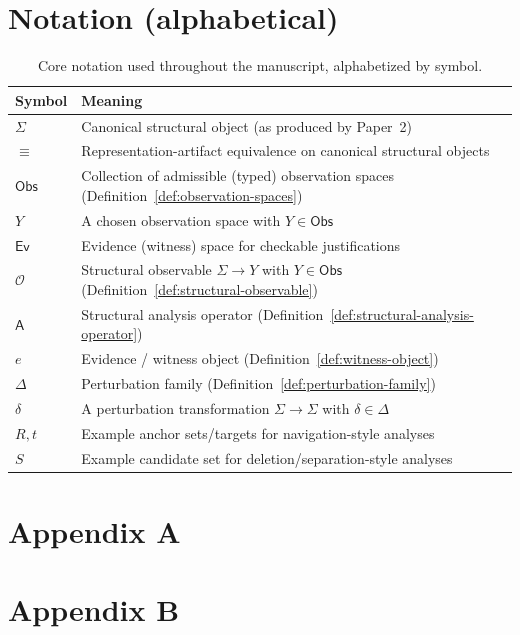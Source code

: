 \documentclass[11pt]{article}
\begin{document}
\section{Notation (alphabetical)}
\label{app:notation}
\begin{table}[h]
\centering
\begin{tabular}{@{}ll@{}}
\toprule
Symbol & Meaning \\
\midrule
$\Sigma$ & Canonical structural object (as produced by Paper~2) \\
$\equiv$ & Representation-artifact equivalence on canonical structural objects \\
$\mathsf{Obs}$ & Collection of admissible (typed) observation spaces (Definition~\ref{def:observation-spaces}) \\
$Y$ & A chosen observation space with $Y\in\mathsf{Obs}$ \\
$\mathsf{Ev}$ & Evidence (witness) space for checkable justifications \\
$\mathcal O$ & Structural observable $\Sigma\to Y$ with $Y\in\mathsf{Obs}$ (Definition~\ref{def:structural-observable}) \\
$\mathsf A$ & Structural analysis operator (Definition~\ref{def:structural-analysis-operator}) \\
$e$ & Evidence / witness object (Definition~\ref{def:witness-object}) \\
$\Delta$ & Perturbation family (Definition~\ref{def:perturbation-family}) \\
$\delta$ & A perturbation transformation $\Sigma\to\Sigma$ with $\delta\in\Delta$ \\
$R,t$ & Example anchor sets/targets for navigation-style analyses \\
$S$ & Example candidate set for deletion/separation-style analyses \\
\bottomrule
\end{tabular}
\caption{Core notation used throughout the manuscript, alphabetized by symbol.}
\end{table}

\section{Appendix A}
\label{app:a}

\section{Appendix B}
\label{app:b}



\end{document}
